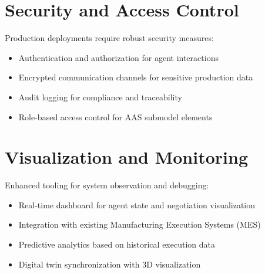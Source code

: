 \section{Security and Access Control}

Production deployments require robust security measures:

\begin{itemize}
    \item Authentication and authorization for agent interactions
    \item Encrypted communication channels for sensitive production data
    \item Audit logging for compliance and traceability
    \item Role-based access control for \ac{AAS} submodel elements
\end{itemize}

\section{Visualization and Monitoring}

Enhanced tooling for system observation and debugging:

\begin{itemize}
    \item Real-time dashboard for agent state and negotiation visualization
    \item Integration with existing Manufacturing Execution Systems (MES)
    \item Predictive analytics based on historical execution data
    \item Digital twin synchronization with 3D visualization
\end{itemize}